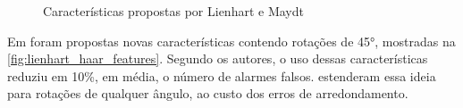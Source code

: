 \begin{figure}[htbp]
   \caption{Características propostas por Lienhart e Maydt}
   \label{fig:lienhart_haar_features}
   \begin{center}
   \end{center}
\end{figure}

Em  foram propostas novas características contendo rotações de \ang{45}, mostradas na \autoref{fig:lienhart_haar_features}. Segundo os autores, o uso dessas características reduziu em 10\%, em média, o número de alarmes falsos.  estenderam essa ideia para rotações de qualquer ângulo, ao custo dos erros de arredondamento.


